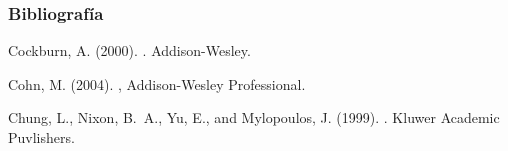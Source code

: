\documentclass[a4paper,slidestop,xcolor=pst,dvips,blue]{beamer}
\begin{document}
\begin{frame}[c]
	\frametitle{Bibliografía}
\begin{thebibliography}{}

Cockburn, A. (2000).
.
\newblock Addison-Wesley.

Cohn, M. (2004).
,
\newblock Addison-Wesley Professional.

Chung, L., Nixon, B.~A., Yu, E., and Mylopoulos, J. (1999).
.
\newblock Kluwer Academic Puvlishers.

\end{thebibliography}

\end{frame}
\end{document}
